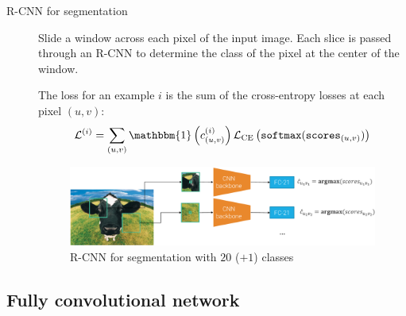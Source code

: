 \begin{description}
    \item[R-CNN for segmentation] 
        Slide a window across each pixel of the input image. Each slice is passed through an R-CNN to determine the class of the pixel at the center of the window.

        The loss for an example $i$ is the sum of the cross-entropy losses at each pixel $(u, v)$:
        \[ \mathcal{L}^{(i)} = \sum_{(u, v)} \mathbbm{1}\left( c_{(u, v)}^{(i)} \right) \mathcal{L}_\text{CE}\left( \texttt{softmax}(\texttt{scores}_{(u, v)}) \right) \]

        \begin{figure}[H]
            \centering
            \includegraphics[width=0.9\linewidth]{./img/_segmentation_rcnn.pdf}
            \caption{R-CNN for segmentation with $20$ ($+1$) classes}
        \end{figure}
\end{description}


\subsection{Fully convolutional network}

